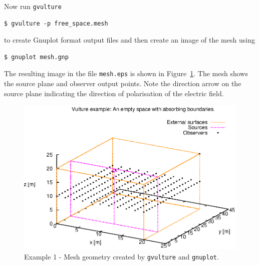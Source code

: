 \documentclass[onecolumn,a4paper]{article}
\numberwithin{equation}{section}
\begin{document}
Now run \texttt{gvulture}
\begin{verbatim}
$ gvulture -p free_space.mesh
\end{verbatim}
to create Gnuplot format output files and then create an image of the mesh using
\begin{verbatim}
$ gnuplot mesh.gnp
\end{verbatim}
The resulting image in the file \texttt{mesh.eps} is shown in Figure~\ref{fg:free_space_mesh}.
The mesh shows the source plane and observer output points. Note the direction arrow
on the source plane indicating the direction of polarisation of the electric field.

\begin{figure}[ht]
\centerline{\includegraphics[width=14cm]{figures/free_space_mesh}}
\caption{\label{fg:free_space_mesh} Example 1 - Mesh geometry created by \texttt{gvulture} and \texttt{gnuplot}.}
\end{figure}
\end{document}
